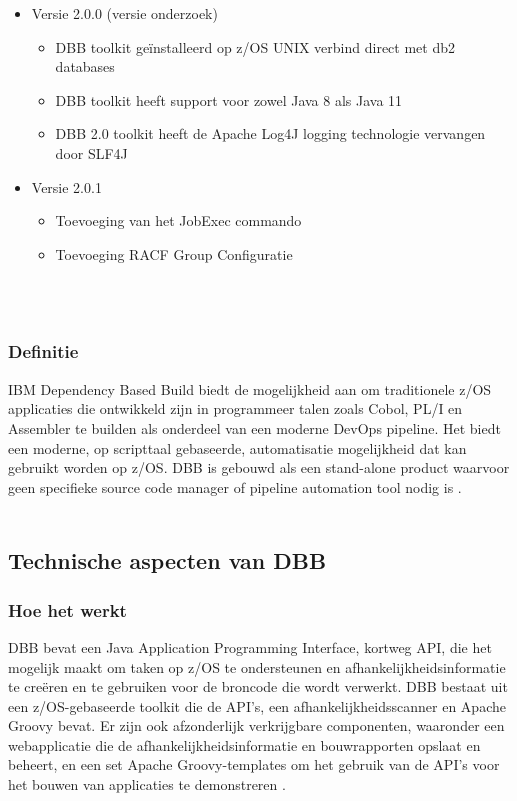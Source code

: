 \begin{itemize}
    \item Versie 2.0.0 (versie onderzoek)
    \begin{itemize}
        \item DBB toolkit geïnstalleerd op z/OS UNIX verbind direct met db2 databases
        \item DBB toolkit heeft support voor zowel Java 8 als Java 11
        \item DBB 2.0 toolkit heeft de Apache Log4J logging technologie vervangen door SLF4J
    \end{itemize}
    \item Versie 2.0.1
    \begin{itemize}
        \item Toevoeging van het JobExec commando
        \item Toevoeging RACF Group Configuratie
    \end{itemize}
\end{itemize}
\autocite{IBM2023a}
\\ \\
\subsubsection{Definitie}
IBM Dependency Based Build biedt de mogelijkheid aan om traditionele z/OS applicaties die ontwikkeld zijn in programmeer talen zoals Cobol, PL/I en Assembler te builden als onderdeel van een moderne DevOps pipeline. Het biedt een moderne, op scripttaal gebaseerde, automatisatie mogelijkheid dat kan gebruikt worden op z/OS. DBB is gebouwd als een stand-alone product waarvoor geen specifieke source code manager of pipeline automation tool nodig is \autocite{IBM2023b}.
\\ \\
\subsection{Technische aspecten van DBB}
\subsubsection{Hoe het werkt}
DBB bevat een Java Application Programming Interface, kortweg API, die het mogelijk maakt om taken op z/OS te ondersteunen en afhankelijkheidsinformatie te creëren en te gebruiken voor de broncode die wordt verwerkt. DBB bestaat uit een z/OS-gebaseerde toolkit die de API's, een afhankelijkheidsscanner en Apache Groovy bevat. Er zijn ook afzonderlijk verkrijgbare componenten, waaronder een webapplicatie die de afhankelijkheidsinformatie en bouwrapporten opslaat en beheert, en een set Apache Groovy-templates om het gebruik van de API's voor het bouwen van applicaties te demonstreren \autocite{IBM2021}.
\\ \\

